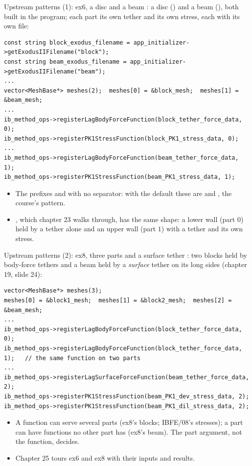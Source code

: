 \documentclass[aspectratio=169,11pt]{beamer}
\begin{document}
\begin{frame}[fragile]{Upstream patterns (1): ex6, a disc and a beam}
\label{fr:upstream}
\footnotesize
{}: a disc () and a beam (), both built in the program; each part its own tether and its own stress, each with its own file:
\begin{lstlisting}[style=cpptiny]
const string block_exodus_filename = app_initializer->getExodusIIFilename("block");
const string beam_exodus_filename = app_initializer->getExodusIIFilename("beam");
...
vector<MeshBase*> meshes(2);  meshes[0] = &block_mesh;  meshes[1] = &beam_mesh;
...
ib_method_ops->registerLagBodyForceFunction(block_tether_force_data, 0);
ib_method_ops->registerPK1StressFunction(block_PK1_stress_data, 0);
...
ib_method_ops->registerLagBodyForceFunction(beam_tether_force_data, 1);
ib_method_ops->registerPK1StressFunction(beam_PK1_stress_data, 1);
\end{lstlisting}
\begin{itemize}
  \item The prefixes  and  with no separator: with the default  these are  and , the course's  pattern.
  \item {}, which chapter 23 walks through, has the same shape: a lower wall (part $0$) held by a tether alone and an upper wall (part $1$) with a tether and its own stress.
\end{itemize}
\end{frame}

\begin{frame}[fragile]{Upstream patterns (2): ex8, three parts and a surface tether}
\label{fr:upstream2}
\footnotesize
{}: two blocks held by body-force tethers and a beam held by a \emph{surface} tether on its long sides (chapter 19, slide 24):
\begin{lstlisting}[style=cpptiny]
vector<MeshBase*> meshes(3);
meshes[0] = &block1_mesh;  meshes[1] = &block2_mesh;  meshes[2] = &beam_mesh;
...
ib_method_ops->registerLagBodyForceFunction(block_tether_force_data, 0);
ib_method_ops->registerLagBodyForceFunction(block_tether_force_data, 1);   // the same function on two parts
...
ib_method_ops->registerLagSurfaceForceFunction(beam_tether_force_data, 2);
ib_method_ops->registerPK1StressFunction(beam_PK1_dev_stress_data, 2);
ib_method_ops->registerPK1StressFunction(beam_PK1_dil_stress_data, 2);
\end{lstlisting}
\begin{itemize}
  \item A function can serve several parts (ex8's blocks; IBFE/08's stresses); a part can have functions no other part has (ex8's beam). The part argument, not the function, decides.
  \item Chapter 25 tours ex6 and ex8 with their inputs and results.
\end{itemize}
\end{frame}
\end{document}
